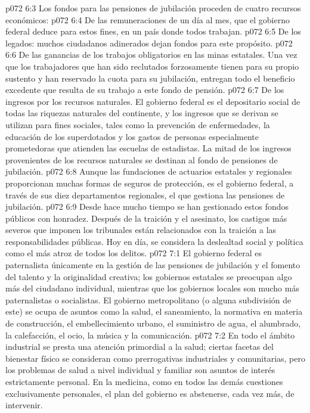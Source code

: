 \vs p072 6:3 \pc Los fondos para las pensiones de jubilación proceden de cuatro recursos económicos:
\vs p072 6:4 De las remuneraciones de un día al mes, que el gobierno federal deduce para estos fines, en un país donde todos trabajan.
\vs p072 6:5 De los legados: muchos ciudadanos adinerados dejan fondos para este propósito.
\vs p072 6:6 De las ganancias de los trabajos obligatorios en las minas estatales. Una vez que los trabajadores que han sido reclutados forzosamente tienen para su propio sustento y han reservado la cuota para su jubilación, entregan todo el beneficio excedente que resulta de su trabajo a este fondo de pensión.
\vs p072 6:7 De los ingresos por los recursos naturales. El gobierno federal es el depositario social de todas las riquezas naturales del continente, y los ingresos que se derivan se utilizan para fines sociales, tales como la prevención de enfermedades, la educación de los superdotados y los gastos de personas especialmente prometedoras que atienden las escuelas de estadistas. La mitad de los ingresos provenientes de los recursos naturales se destinan al fondo de pensiones de jubilación.
\vs p072 6:8 \pc Aunque las fundaciones de actuarios estatales y regionales proporcionan muchas formas de seguros de protección, es el gobierno federal, a través de sus diez departamentos regionales, el que gestiona las pensiones de jubilación.
\vs p072 6:9 Desde hace mucho tiempo se han gestionado estos fondos públicos con honradez. Después de la traición y el asesinato, los castigos más severos que imponen los tribunales están relacionados con la traición a las responsabilidades públicas. Hoy en día, se considera la deslealtad social y política como el más atroz de todos los delitos.
\vs p072 7:1 El gobierno federal es paternalista únicamente en la gestión de las pensiones de jubilación y el fomento del talento y la originalidad creativa; los gobiernos estatales se preocupan algo más del ciudadano individual, mientras que los gobiernos locales son mucho más paternalistas o socialistas. El gobierno metropolitano (o alguna subdivisión de este) se ocupa de asuntos como la salud, el saneamiento, la normativa en materia de construcción, el embellecimiento urbano, el suministro de agua, el alumbrado, la calefacción, el ocio, la música y la comunicación.
\vs p072 7:2 En todo el ámbito industrial se presta una atención primordial a la salud; ciertas facetas del bienestar físico se consideran como prerrogativas industriales y comunitarias, pero los problemas de salud a nivel individual y familiar son asuntos de interés estrictamente personal. En la medicina, como en todos las demás cuestiones exclusivamente personales, el plan del gobierno es abstenerse, cada vez más, de intervenir.

